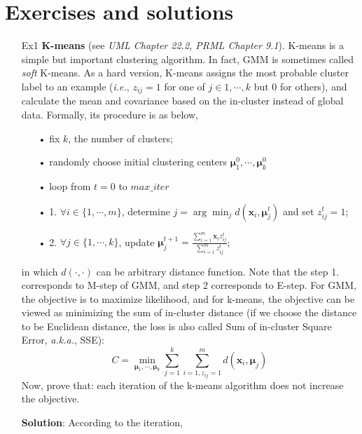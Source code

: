 \documentclass{article}
\begin{document}
\section{Exercises and solutions}
\begin{itemize}
\item[Ex1] \textbf{K-means} (see \textit{UML Chapter 22.2, PRML Chapter 9.1}). K-means is a simple but important clustering algorithm. In fact, GMM is sometimes called \textit{soft} K-means. As a hard version, K-means assigns the most probable cluster label to an example (\textit{i.e.}, $z_{ij}=1$ for one of $j\in{1,\cdots,k}$ but 0 for others), and calculate the mean and covariance based on the in-cluster instead of global data. Formally, its procedure is as below,

	\begin{minipage}{.9\linewidth}
    \begin{itemize}
	\item[•] fix $k$, the number of clusters;
	\item[•] randomly choose initial clustering centers $\bm{\mu}^0_1,\cdots,\bm{\mu}^0_k$
	\item[•] loop from $t=0$ to $max\_iter$
	\item[•] 1. $\forall i\in \{1,\cdots,m\}$, determine $j=\arg\min_{j} d(\bm{x}_i, \bm{\mu}_j^t)$ and set $z_{ij}^t=1$;
	\item[•] 2. $\forall j\in \{1,\cdots,k\}$, update $\bm{\mu}_j^{t+1} = \frac{\sum_{i=1}^m \bm{x}_i z^t_{ij}}{\sum_{i=1}^m z^t_{ij}} $;
	\end{itemize}
  	\end{minipage}

in which $d(\cdot,\cdot)$ can be arbitrary distance function. Note that the step 1. corresponds to M-step of GMM, and step 2 corresponds to E-step. For GMM, the objective is to maximize likelihood, and for k-means, the objective can be viewed as minimizing the sum of in-cluster distance (if we choose the distance to be Euclidean distance, the loss is also called Sum of in-cluster Square Error, \textit{a.k.a.}, SSE):
	\begin{equation*}
	C = \min_{\bm{\mu}_1,\cdots,\bm{\mu}_k} \sum_{j=1}^k \sum_{i=1, z_{ij}=1}^m d(\bm{x}_i, \bm{\mu}_j)
	\end{equation*}
Now, prove that: each iteration of the k-means algorithm does not increase the objective.

\item[] \textbf{Solution}: According to the iteration, 
	

\end{itemize}
\end{document}
